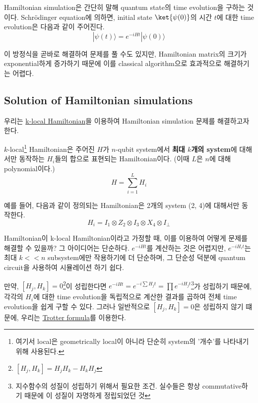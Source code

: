 Hamiltonian simulation은 간단히 말해 quantum state의 time evolution을 구하는 것이다. Schrödinger equation에 의하면, initial state $\ket{\psi(0)}$의 시간 $t$에 대한 time evolution은 다음과 같이 주어진다.
\begin{equation*}
  |\psi(t)\rangle=e^{-i H t}|\psi(0)\rangle
\end{equation*}

이 방정식을 곧바로 해결하여 문제를 풀 수도 있지만, Hamiltonian matrix의 크기가 exponential하게 증가하기 때문에 이를 classical algorithm으로 효과적으로 해결하기는 어렵다.

\subsection{Solution of Hamiltonian simulations}
우리는 \hyperref[def:k-local-Hamiltonian]{k-local Hamiltonian}을 이용하여 Hamiltonian simulation 문제를 해결하고자 한다.
\begin{definition}\label{def:k-local-Hamiltonian}
  $k$-local\footnote{여기서 local은 geometrically local이 아니라 단순히 system의 '개수'를 나타내기 위해 사용된다.} Hamiltonian은 주어진 $H$가 $n$-qubit system에서 \textbf{최대 $k$개의 system}에 대해서만 동작하는 $H_i$들의 합으로 표현되는 Hamiltonian이다. (이때 $L$은 $n$에 대해 polynomial이다.)
  $$ H=\sum_{i=1}^L H_i $$
\end{definition}

\begin{eg}
  예를 들어, 다음과 같이 정의되는 Hamiltonian은 2개의 system (2, 4)에 대해서만 동작한다.
  $$ H_i = I_1 \otimes Z_2 \otimes I_3 \otimes X_4 \otimes I_{\perp} $$
\end{eg}

\newpage 
Hamiltonian이 k-local Hamiltonian이라고 가정할 때, 이를 이용하여 어떻게 문제를 해결할 수 있을까?
그 아이디어는 단순하다. $e^{-i H t}$를 계산하는 것은 어렵지만, $e^{-i H_i t}$는 최대 $k << n$ subsystem에만 작용하기에 더 단순하며, 그 단순성 덕분에 quantum circuit을 사용하여 시뮬레이션 하기 쉽다.

만약, $[H_j, H_k] = 0$\footnote{$[H_j, H_k] = H_jH_k - H_kH_j$}이 성립한다면 $e^{-iHt} =e^{-i \sum H_j t} = \prod e^{-i H_j t}$\footnote{지수함수의 성질이 성립하기 위해서 필요한 조건. 실수들은 항상 commutative하기 때문에 이 성질이 자명하게 정립되었던 것}가 성립하기 때문에, 각각의 $H_i$에 대한 time evolution을 독립적으로 계산한 결과를 곱하여 전체 time evolution을 쉽게 구할 수 있다.
그러나 일반적으로 $[H_j, H_k] = 0$은 성립하지 않기 떄문에, 우리는 \hyperref[thm:trotter-formula]{Trotter formula}를 이용한다.


